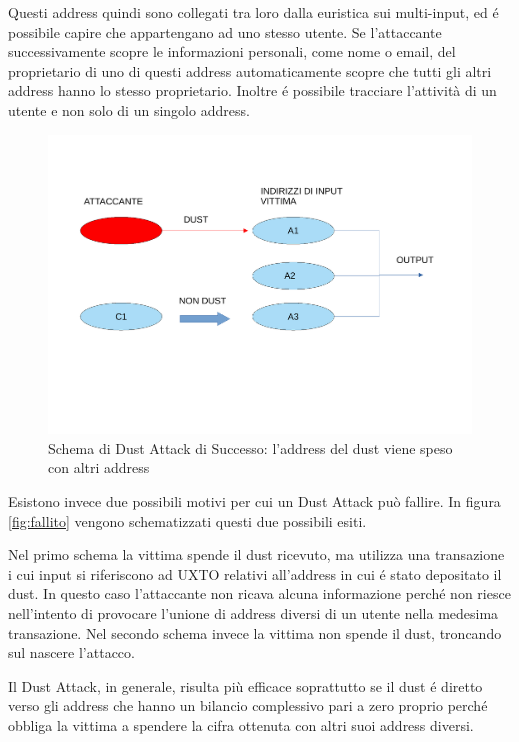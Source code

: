 Questi address quindi sono collegati tra loro dalla euristica sui multi-input, ed é possibile capire che appartengano ad uno stesso utente. Se l'attaccante successivamente scopre le informazioni personali, come nome o email, del proprietario di uno di questi address automaticamente scopre che tutti gli altri address hanno lo stesso proprietario. Inoltre é possibile tracciare l'attività di un utente e non solo di un singolo address.
\begin{figure}[h!]
    \centering
    \includegraphics[scale=0.5,trim = 1cm 6cm 0cm 3cm, clip]{Images/successo.pdf}
    \caption{Schema di Dust Attack di Successo: l'address del dust viene speso con altri address}
    \label{fig:success}
\end{figure}
\FloatBarrier
Esistono invece due possibili motivi per cui un Dust Attack può fallire. In figura \ref{fig:fallito} vengono schematizzati questi due possibili esiti.

Nel primo schema la vittima spende il dust ricevuto, ma utilizza una transazione i cui input si riferiscono ad UXTO relativi all'address in cui é stato depositato il dust. In questo caso l'attaccante non ricava alcuna informazione perché non riesce nell'intento di provocare l'unione di address diversi di un utente nella medesima transazione. Nel secondo schema invece la vittima non spende il dust, troncando sul nascere l'attacco. 

Il Dust Attack, in generale, risulta più efficace soprattutto se il dust é diretto verso gli address che hanno un bilancio complessivo pari a zero proprio perché obbliga la vittima a spendere la cifra ottenuta con altri suoi address diversi.


